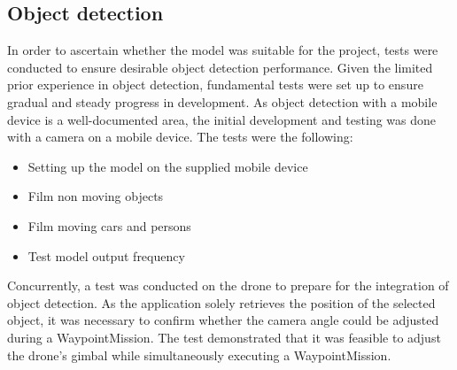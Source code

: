 \subsection{Object detection}
\label{val_obj_det}
In order to ascertain whether the model was suitable for the project, tests were conducted to ensure desirable object detection performance. Given the limited prior experience in object detection, fundamental tests were set up to ensure gradual and steady progress in development. As object detection with a mobile device is a well-documented area, the initial development and testing was done with a camera on a mobile device. The tests were the following:
\\
\begin{itemize}\itemsep0.2em
    \item Setting up the model on the supplied mobile device
    \item Film non moving objects
    \item Film moving cars and persons
    \item Test model output frequency \\
\end{itemize}

Concurrently, a test was conducted on the drone to prepare for the integration of object detection. As the application solely retrieves the position of the selected object, it was necessary to confirm whether the camera angle could be adjusted during a WaypointMission. The test demonstrated that it was feasible to adjust the drone's gimbal while simultaneously executing a WaypointMission.
